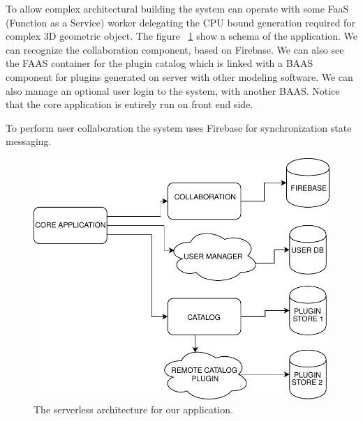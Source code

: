 To allow complex architectural building the system can operate with some FaaS (Function as a Service) worker delegating the CPU bound generation required for complex 3D geometric object. The figure ~\ref{fig_serverless} show a schema of the application. We can recognize the collaboration component, based on Firebase. We can also see the FAAS container for the plugin catalog which is linked with a BAAS component for plugins generated on server with other modeling software. We can also manage an optional user login to the system, with another BAAS. Notice that the core application is entirely run on front end side.

To perform user collaboration the system uses Firebase for synchronization state messaging.

\begin{figure}[htb]
\centering
\includegraphics[width=\linewidth]{contents/images/serverless-diagram}

\caption{The serverless architecture for our application.}
\label{fig_serverless}
\end{figure}